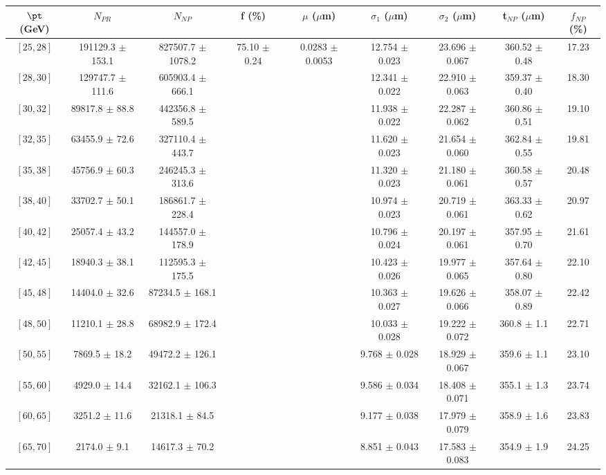 \begin{tabular}{c||c|c|c|c|c|c|c||c}
$\pt$ (GeV) & $N_{PR}$ & $N_{NP}$ & f (\%) & $\mu$ ($\mu$m) & $\sigma_1$ ($\mu$m) & $\sigma_2$ ($\mu$m)  & t$_{NP}$ ($\mu$m) & $f_{NP}$ (\%) \\
\hline
$[25, 28]$ & 191129.3 $\pm$ 153.1 & 827507.7 $\pm$ 1078.2 & \multirow{19}{*}{75.10 $\pm$ 0.24} & \multirow{19}{*}{0.0283 $\pm$ 0.0053} & 12.754 $\pm$ 0.023 & 23.696 $\pm$ 0.067 & 360.52 $\pm$ 0.48 & 17.23\\
$[28, 30]$ & 129747.7 $\pm$ 111.6 & 605903.4 $\pm$ 666.1 &  &  & 12.341 $\pm$ 0.022 & 22.910 $\pm$ 0.063 & 359.37 $\pm$ 0.40 & 18.30\\
$[30, 32]$ & 89817.8 $\pm$ 88.8 & 442356.8 $\pm$ 589.5 &  &  & 11.938 $\pm$ 0.022 & 22.287 $\pm$ 0.062 & 360.86 $\pm$ 0.51 & 19.10\\
$[32, 35]$ & 63455.9 $\pm$ 72.6 & 327110.4 $\pm$ 443.7 &  &  & 11.620 $\pm$ 0.023 & 21.654 $\pm$ 0.060 & 362.84 $\pm$ 0.55 & 19.81\\
$[35, 38]$ & 45756.9 $\pm$ 60.3 & 246245.3 $\pm$ 313.6 &  &  & 11.320 $\pm$ 0.023 & 21.180 $\pm$ 0.061 & 360.58 $\pm$ 0.57 & 20.48\\
$[38, 40]$ & 33702.7 $\pm$ 50.1 & 186861.7 $\pm$ 228.4 &  &  & 10.974 $\pm$ 0.023 & 20.719 $\pm$ 0.061 & 363.33 $\pm$ 0.62 & 20.97\\
$[40, 42]$ & 25057.4 $\pm$ 43.2 & 144557.0 $\pm$ 178.9 &  &  & 10.796 $\pm$ 0.024 & 20.197 $\pm$ 0.061 & 357.95 $\pm$ 0.70 & 21.61\\
$[42, 45]$ & 18940.3 $\pm$ 38.1 & 112595.3 $\pm$ 175.5 &  &  & 10.423 $\pm$ 0.026 & 19.977 $\pm$ 0.065 & 357.64 $\pm$ 0.80 & 22.10\\
$[45, 48]$ & 14404.0 $\pm$ 32.6 & 87234.5 $\pm$ 168.1 &  &  & 10.363 $\pm$ 0.027 & 19.626 $\pm$ 0.066 & 358.07 $\pm$ 0.89 & 22.42\\
$[48, 50]$ & 11210.1 $\pm$ 28.8 & 68982.9 $\pm$ 172.4 &  &  & 10.033 $\pm$ 0.028 & 19.222 $\pm$ 0.072 & 360.8 $\pm$ 1.1 & 22.71\\
$[50, 55]$ & 7869.5 $\pm$ 18.2 & 49472.2 $\pm$ 126.1 &  &  & 9.768 $\pm$ 0.028 & 18.929 $\pm$ 0.067 & 359.6 $\pm$ 1.1 & 23.10\\
$[55, 60]$ & 4929.0 $\pm$ 14.4 & 32162.1 $\pm$ 106.3 &  &  & 9.586 $\pm$ 0.034 & 18.408 $\pm$ 0.071 & 355.1 $\pm$ 1.3 & 23.74\\
$[60, 65]$ & 3251.2 $\pm$ 11.6 & 21318.1 $\pm$ 84.5 &  &  & 9.177 $\pm$ 0.038 & 17.979 $\pm$ 0.079 & 358.9 $\pm$ 1.6 & 23.83\\
$[65, 70]$ & 2174.0 $\pm$ 9.1 & 14617.3 $\pm$ 70.2 &  &  & 8.851 $\pm$ 0.043 & 17.583 $\pm$ 0.083 & 354.9 $\pm$ 1.9 & 24.25\\

\end{tabular}
